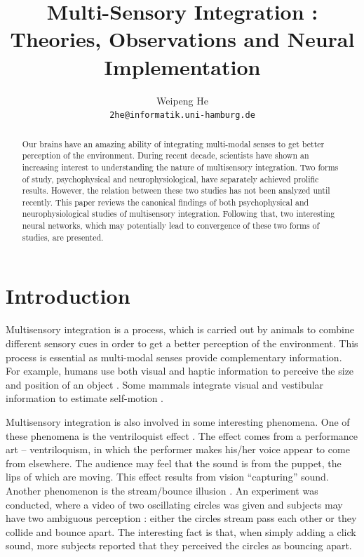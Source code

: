 \documentclass{article}[11pt]
\title{Multi-Sensory Integration : Theories, Observations and Neural Implementation}
\author{Weipeng He \\ \texttt{2he@informatik.uni-hamburg.de}}
\begin{document}
\maketitle

\begin{abstract}
  Our brains have an amazing ability of integrating multi-modal senses to get better perception of the environment. During recent decade, scientists have shown an increasing interest to understanding the nature of multisensory integration. Two forms of study, psychophysical and neurophysiological, have separately achieved prolific results. However, the relation between these two studies has not been analyzed until recently. 
  This paper reviews the canonical findings of both psychophysical and neurophysiological studies of multisensory integration. Following that, two interesting neural networks, which may potentially lead to convergence of these two forms of studies, are presented.
\end{abstract}

\section{Introduction}
\label{sec:intro}

Multisensory integration is a process, which is carried out by animals to combine different sensory cues in order to get a better perception of the environment. This process is essential as multi-modal senses provide complementary information.
For example, humans use both visual and haptic information to perceive the size and position of an object \cite{ernst_humans_2002}. Some mammals integrate visual and vestibular information to estimate self-motion \cite{gu_visual_2006}.

Multisensory integration is also involved in some interesting phenomena. One of these phenomena is the ventriloquist effect \cite{alais_ventriloquist_2004}. The effect comes from a performance art -- ventriloquism, in which the performer makes his/her voice appear to come from elsewhere. The audience may feel that the sound is from the puppet, the lips of which are moving. This effect results from vision ``capturing'' sound.
Another phenomenon is the stream/bounce illusion \cite{sekuler_sound_1997}. An experiment was conducted, where a video of two oscillating circles was given and subjects may have two ambiguous perception : either the circles stream pass each other or they collide and bounce apart. The interesting fact is that, when simply adding a click sound, more subjects reported that they perceived the circles as bouncing apart.
\end{document}
